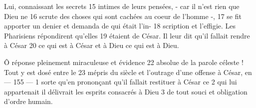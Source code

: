 Lui, connaissant les secrets	 
15	 	intimes de leurs pensées, - car il n'est rien que Dieu ne	 
16	 	scrute des choses qui sont cachées au coeur de l'homme -,	 
17	 	se fit apporter un denier et demanda de qui était l'in-	 
18	 	scription et l'effigie. Les Pharisiens répondirent qu'elles	 
19	 	étaient de César. Il leur dit qu'il fallait rendre à César	 
20	 	ce qui est à César et à Dieu ce qui est à Dieu.

Ô réponse pleinement miraculeuse et évidence	 
22	 	absolue de la parole céleste ! Tout y est dosé entre le	 
23	 	mépris du siècle et l'outrage d'une offense à César, en	 
 	--- 155 ---	 
1	 	sorte qu'en prononçant qu'il fallait restituer à César ce	 
2	 	qui lui appartenait il délivrait les esprits consacrés à Dieu	 
3	 	de tout souci et obligation d'ordre humain.